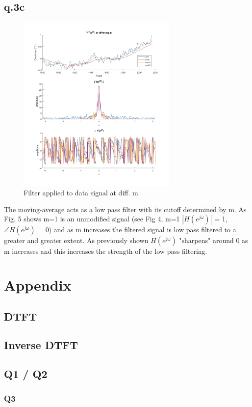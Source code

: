 \documentclass[11pt]{article}
\begin{document}
\subsection{q.3c}
\begin{figure}[h]
	\begin{center}
	\includegraphics[width=0.7\textwidth]{q3_filtered}
	\caption{Filter applied to data signal at diff. m}
	\end{center}
\end{figure}

The moving-average acts as  a low pass filter with its cutoff determined by m. As Fig. 5 shows m=1 is an unmodified signal (see Fig 4, m=1 $|H(e^{j\omega})|$ = 1, $\angle H(e^{j\omega})$ = 0) and as m increases the filtered signal is low pass filtered to a greater and greater extent. As previously shown $H(e^{j\omega})$  "sharpens" around 0 as m increases and this increases the strength of the low pass filtering.


\newpage
\section*{Appendix}

\subsection*{DTFT}

\subsection*{Inverse DTFT}

\subsection*{Q1 / Q2}

\newpage
\subsubsection*{Q3}

\end{document}
